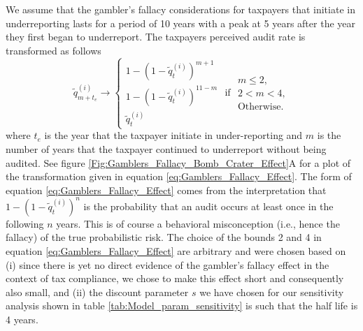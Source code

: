 \documentclass{NSF_proposal_mod}
\begin{document}
We assume that the gambler's fallacy considerations for taxpayers that initiate in underreporting lasts for a period of 10 years with a peak at 5 years after the year they first began to underreport.  The taxpayers perceived audit rate is transformed as follows
\begin{equation}
\tilde{q}^{(i)}_{m+t_e} \to 
\left\{ 
\begin{array}{c}
1- (1-\tilde{q}^{(i)}_t)^{m+1} \\
1- (1-\tilde{q}^{(i)}_t)^{11-m}\\
 \tilde{q}^{(i)}_t 
\end{array} \right .\mbox{ if }
\begin{array}{c}
m\le 2, \\
2< m< 4,\\
\mbox{Otherwise.}
\end{array}
\label{eq:Gamblers_Fallacy_Effect}
\end{equation} 
where $t_e$ is the year that the taxpayer initiate in under-reporting and $m$ is the number of years that the taxpayer continued to underreport without being audited. See figure \ref{Fig:Gamblers_Fallacy_Bomb_Crater_Effect}A for a plot of the transformation given in equation \ref{eq:Gamblers_Fallacy_Effect}. The form of equation \ref{eq:Gamblers_Fallacy_Effect} comes from the interpretation that $1- (1-\tilde{q}^{(i)}_t)^n$ is the probability that an audit occurs at least once in the following $n$ years. This is of course a behavioral misconception (i.e., hence the fallacy) of the true probabilistic risk. The choice of the bounds 2 and 4 in equation \ref{eq:Gamblers_Fallacy_Effect} are arbitrary and were chosen based on (i) since there is yet no direct evidence of the  gambler's fallacy effect in  the context of tax compliance, we chose to make this effect short and consequently also small, and (ii) the discount parameter $s$ we have chosen for our sensitivity analysis shown in table \ref{tab:Model_param_sensitivity} is such that the half life is 4 years. 
\end{document}

